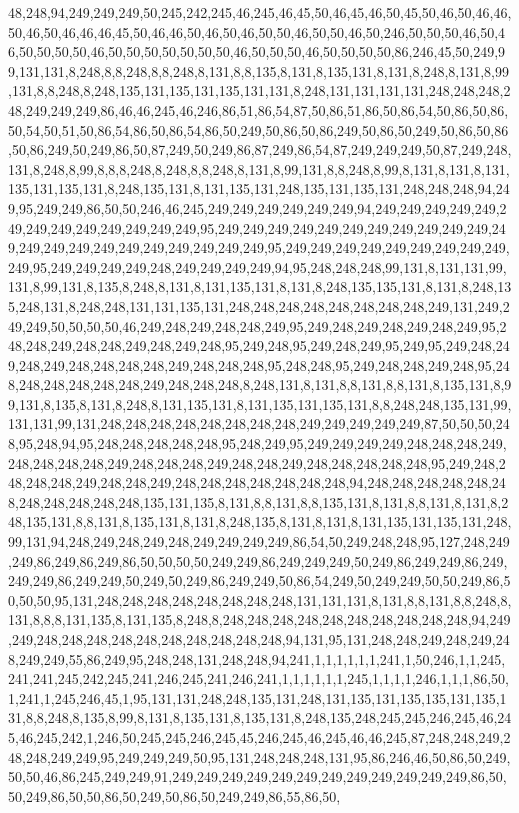 48,248,94,249,249,249,50,245,242,245,46,245,46,45,50,46,45,46,50,45,50,46,50,46,46,50,46,50,46,46,46,45,50,46,46,50,46,50,46,50,50,46,50,50,46,50,246,50,50,50,46,50,46,50,50,50,50,46,50,50,50,50,50,50,50,46,50,50,50,46,50,50,50,50,86,246,45,50,249,99,131,131,8,248,8,8,248,8,8,248,8,131,8,8,135,8,131,8,135,131,8,131,8,248,8,131,8,99,131,8,8,248,8,248,135,131,135,131,135,131,131,8,248,131,131,131,131,248,248,248,248,249,249,249,86,46,46,245,46,246,86,51,86,54,87,50,86,51,86,50,86,54,50,86,50,86,50,54,50,51,50,86,54,86,50,86,54,86,50,249,50,86,50,86,249,50,86,50,249,50,86,50,86,50,86,249,50,249,86,50,87,249,50,249,86,87,249,86,54,87,249,249,249,50,87,249,248,131,8,248,8,99,8,8,8,248,8,248,8,8,248,8,131,8,99,131,8,8,248,8,99,8,131,8,131,8,131,135,131,135,131,8,248,135,131,8,131,135,131,248,135,131,135,131,248,248,248,94,249,95,249,249,86,50,50,246,46,245,249,249,249,249,249,249,94,249,249,249,249,249,249,249,249,249,249,249,249,249,95,249,249,249,249,249,249,249,249,249,249,249,249,249,249,249,249,249,249,249,249,249,249,95,249,249,249,249,249,249,249,249,249,249,95,249,249,249,249,248,249,249,249,249,94,95,248,248,248,99,131,8,131,131,99,131,8,99,131,8,135,8,248,8,131,8,131,135,131,8,131,8,248,135,135,131,8,131,8,248,135,248,131,8,248,248,131,131,135,131,248,248,248,248,248,248,248,248,249,131,249,249,249,50,50,50,50,46,249,248,249,248,248,249,95,249,248,249,248,249,248,249,95,248,248,249,248,248,249,248,249,248,95,249,248,95,249,248,249,95,249,95,249,248,249,248,249,248,248,248,248,249,248,248,248,95,248,248,95,249,248,248,249,248,95,248,248,248,248,248,248,249,248,248,248,8,248,131,8,131,8,8,131,8,8,131,8,135,131,8,99,131,8,135,8,131,8,248,8,131,135,131,8,131,135,131,135,131,8,8,248,248,135,131,99,131,131,99,131,248,248,248,248,248,248,248,248,249,249,249,249,249,87,50,50,50,248,95,248,94,95,248,248,248,248,248,95,248,249,95,249,249,249,249,248,248,248,249,248,248,248,248,249,248,248,248,249,248,248,249,248,248,248,248,248,95,249,248,248,248,248,249,248,248,249,248,248,248,248,248,248,248,94,248,248,248,248,248,248,248,248,248,248,248,135,131,135,8,131,8,8,131,8,8,135,131,8,131,8,8,131,8,131,8,248,135,131,8,8,131,8,135,131,8,131,8,248,135,8,131,8,131,8,131,135,131,135,131,248,99,131,94,248,249,248,249,248,249,249,249,249,86,54,50,249,248,248,95,127,248,249,249,86,249,86,249,86,50,50,50,50,249,249,86,249,249,249,50,249,86,249,249,86,249,249,249,86,249,249,50,249,50,249,86,249,249,50,86,54,249,50,249,249,50,50,249,86,50,50,50,95,131,248,248,248,248,248,248,248,248,131,131,131,8,131,8,8,131,8,8,248,8,131,8,8,8,131,135,8,131,135,8,248,8,248,248,248,248,248,248,248,248,248,248,94,249,249,248,248,248,248,248,248,248,248,248,248,94,131,95,131,248,248,249,248,249,248,249,249,55,86,249,95,248,248,131,248,248,94,241,1,1,1,1,1,1,241,1,50,246,1,1,245,241,241,245,242,245,241,246,245,241,246,241,1,1,1,1,1,1,245,1,1,1,1,246,1,1,1,86,50,1,241,1,245,246,45,1,95,131,131,248,248,135,131,248,131,135,131,135,135,131,135,131,8,8,248,8,135,8,99,8,131,8,135,131,8,135,131,8,248,135,248,245,245,246,245,46,245,46,245,242,1,246,50,245,245,246,245,45,246,245,46,245,46,46,245,87,248,248,249,248,248,249,249,95,249,249,249,50,95,131,248,248,248,131,95,86,246,46,50,86,50,249,50,50,46,86,245,249,249,91,249,249,249,249,249,249,249,249,249,249,249,249,86,50,50,249,86,50,50,86,50,249,50,86,50,249,249,86,55,86,50,